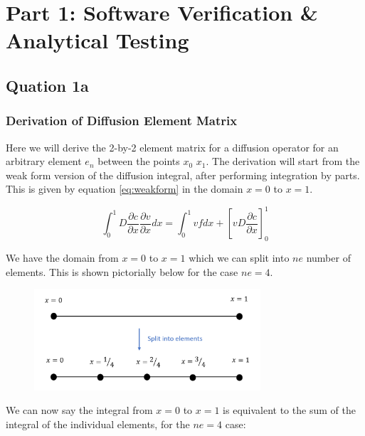 \documentclass[11pt]{article}
\begin{document}


\clearpage
{}
\section{Part 1: Software Verification \& Analytical Testing}

\subsection{Quation 1a}
\subsubsection{Derivation of Diffusion Element Matrix}

Here we will derive the 2-by-2 element matrix for a diffusion operator for an arbitrary element $e_{n}$ between the points $x_{0}$ $x_{1}$. The derivation will start from the weak form version of the diffusion integral, after performing integration by parts. This is given by equation \ref{eq:weakform} in the domain $x = 0$ to $x = 1$.

\begin{equation} \label{eq:weakform}
\int_0^1 D \frac{\partial c}{\partial x}  \frac{\partial v}{\partial x}  dx = \int_0^1 vf dx + \left[vD\frac{\partial c}{\partial x} \right]_0^1
\end{equation}

We have the domain from $x = 0$ to $ x = 1$ which we can split into $ne$ number of elements. This is shown pictorially below for the case $ne = 4$.

\begin{figure}[h!]
\centering
\includegraphics[width=0.75\textwidth]{SplitIntoElements.PNG}
\end{figure}

We can now say the integral from $x = 0$ to $x = 1$ is equivalent to the sum of the integral of the individual elements, for the $ne = 4$ case:
\end{document}
